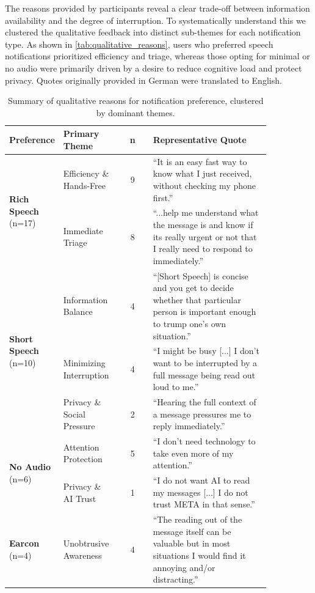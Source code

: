 The reasons provided by participants reveal a clear trade-off between information availability and the degree of interruption. To systematically understand this we clustered the qualitative feedback into distinct sub-themes for each notification type. As shown in \autoref{tab:qualitative_reasons}, users who preferred speech notifications prioritized efficiency and triage, whereas those opting for minimal or no audio were primarily driven by a desire to reduce cognitive load and protect privacy. Quotes originally provided in German were translated to English.

\begin{table}[H]
\centering
\footnotesize
\caption{Summary of qualitative reasons for notification preference, clustered by dominant themes.}
\label{tab:qualitative_reasons}
\begin{tabular}{p{0.18\linewidth} p{0.22\linewidth} c p{0.45\linewidth}}
\toprule
\textbf{Preference} & \textbf{Primary Theme} & \textbf{n} & \textbf{Representative Quote} \\
\midrule
\multirow{2}{*}{\parbox{\linewidth}{\textbf{Rich Speech}\\(n=17)}} 
 & Efficiency \& Hands-Free & 9 & ``It is an easy fast way to know what I just received, without checking my phone first.'' \\
\cmidrule{2-4}
 & Immediate Triage & 8 & ``...help me understand what the message is and know if its really urgent or not that I really need to respond to immediately.'' \\
\midrule
\multirow{3}{*}{\parbox{\linewidth}{\textbf{Short Speech}\\(n=10)}} 
 & Information Balance & 4 & ``[Short Speech] is concise and you get to decide whether that particular person is important enough to trump one's own situation.'' \\
\cmidrule{2-4}
 & Minimizing Interruption & 4 & ``I might be busy [...] I don't want to be interrupted by a full message being read out loud to me.'' \\
\cmidrule{2-4}
 & Privacy \& Social Pressure & 2 & ``Hearing the full context of a message pressures me to reply immediately.'' \\
\midrule
\multirow{2}{*}{\parbox{\linewidth}{\textbf{No Audio}\\(n=6)}} 
 & Attention Protection & 5 & ``I don't need technology to take even more of my attention.'' \\
\cmidrule{2-4}
 & Privacy \& AI Trust & 1 & ``I do not want AI to read my messages [...] I do not trust META in that sense.'' \\
\midrule
\textbf{Earcon} (n=4) 
 & Unobtrusive Awareness & 4 & ``The reading out of the message itself can be valuable but in most situations I would find it annoying and/or distracting.'' \\
\bottomrule
\end{tabular}
\end{table}

